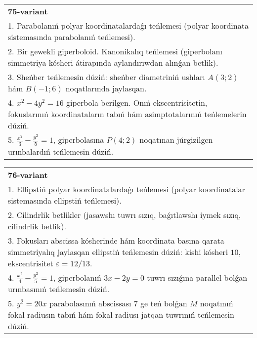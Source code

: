 \documentclass{article}
\begin{document}
\begin{tabular}{m{17cm}}
\textbf{75-variant}\\
1. Parabolanıń polyar koordinatalardaǵı teńlemesi (polyar koordinata sistemasında parabolanıń teńlemesi).\\

2. Bir gewekli giperboloid. Kanonikalıq teńlemesi (giperbolanı simmetriya kósheri átirapında aylandırıwdan alınǵan betlik).\\

3. Sheńber teńlemesin dúziń: sheńber diametriniń ushları $A (3;2) $ hám $B (-1;6 ) $ noqatlarında jaylasqan.\\

4. $x^{2} - 4y^{2} = 16$ giperbola berilgen. Onıń ekscentrisitetin, fokuslarınıń koordinataların tabıń hám asimptotalarınıń teńlemelerin dúziń.\\

5. $\frac{x^{2}}{3} - \frac{y^{2}}{5} = 1$, giperbolasına $P(4;2)$ noqatınan júrgizilgen urınbalardıń teńlemesin dúziń.  
\end{tabular}
\vspace{1cm}


\begin{tabular}{m{17cm}}
\textbf{76-variant}\\
1. Ellipstiń polyar koordinatalardaǵı teńlemesi (polyar koordinatalar sistemasında ellipstiń teńlemesi).\\

2. Cilindrlik betlikler (jasawshı tuwrı sızıq, baǵıtlawshı iymek sızıq, cilindrlik betlik).\\

3. Fokusları abscissa kósherinde hám koordinata basına qarata simmetriyalıq jaylasqan ellipstiń teńlemesin dúziń: kishi kósheri $10$, ekscentrisitet $\varepsilon=12/13$.\\

4. $\frac{x^{2}}{4} - \frac{y^{2}}{5} = 1$, giperbolanıń $3x - 2y = 0$ tuwrı sızıǵına parallel bolǵan urınbasınıń teńlemesin dúziń.  \\

5. $y^{2} = 20x$ parabolasınıń abscissası 7 ge teń bolǵan $M$ noqatınıń fokal radiusın tabıń hám fokal radiusı jatqan tuwrınıń teńlemesin dúziń.  
\end{tabular}
\vspace{1cm}
\end{document}
